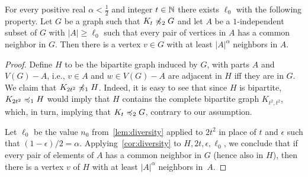 \begin{corollary}\label{cor:biversity}
    For every positive real $\alpha<\frac 1 2$ and integer $t\in\mathbb{N}$ there exists $\ell_0$ with the following property.
  Let $G$ be a graph such that $K_t\not\preccurlyeq_2 G$
  and let
  $A$ be a $1$-independent subset of $G$ with $|A|\ge \ell_0$ such that every pair of vertices in $A$ has a common neighbor in $G$.
   Then there is a vertex $v\in G$
  with at least $|A|^{\alpha}$ neighbors in $A$.
\end{corollary}
\begin{proof}\label{pf:}
  Define $H$ to be the bipartite graph induced 
  by $G$, with parts $A$ and $V(G)-A$, i.e.,  $v\in A$ and $w\in V(G)-A$ are adjacent in $H$ iff they are in $G$. 
  We claim that $K_{2t^2}\not\preccurlyeq_1 H$. Indeed, it is easy to see that 
  since $H$ is bipartite, $K_{2t^2}\preccurlyeq_1 H$ would imply that $H$ contains the 
  complete bipartite graph $K_{t^2,t^2}$,  which, in turn, implying that $K_{t}\preccurlyeq_2 G$, contrary to our assumption.  

  Let $\ell_0$
    be the value $n_0$ from~\cref{lem:diversity} applied to $2t^2$ in place of $t$ and $\epsilon$ such that $(1-\epsilon)/2=\alpha$. Applying~\cref{cor:diversity} to $H,2t,\epsilon,\ell_0$, we conclude that if every pair of elements of $A$ has a common neighbor in $G$
    (hence also in $H$), then there is a vertex $v$
    of $H$ with at least $|A|^{\alpha}$ neighbors in~$A$.
\end{proof}

